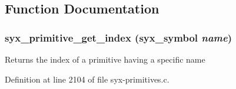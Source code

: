 \subsection{Function Documentation}
\hypertarget{syx-primitives_8c_c3af1a1fed278ee0e606de57cc0cbd2f}{
\subsubsection{ syx\_\-primitive\_\-get\_\-index ({\bf syx\_\-symbol} {\em name})}}
\label{syx-primitives_8c_c3af1a1fed278ee0e606de57cc0cbd2f}


Returns the index of a primitive having a specific name 

Definition at line 2104 of file syx-primitives.c.